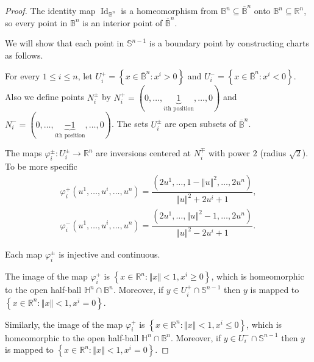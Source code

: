 \begin{proof}
    The identity map \( \operatorname{Id}_{\mathbb{B}^{n}} \) is a homeomorphism from \( \mathbb{B}^{n} \subseteq \overline{\mathbb{B}}^{n} \) onto \( \mathbb{B}^{n} \subseteq \mathbb{R}^{n} \), so every point in \( \mathbb{B}^{n} \) is an interior point of \( \overline{\mathbb{B}}^{n} \).

    We will show that each point in \( \mathbb{S}^{n-1} \) is a boundary point by constructing charts as follows.

    For every \( 1 \le i \le n \), let \( U_{i}^{+} = \left\{ x \in \overline{\mathbb{B}}^{n} : x^{i} > 0 \right\} \) and \( U_{i}^{-} = \left\{ x \in \overline{\mathbb{B}}^{n} : x^{i} < 0 \right\} \). Also we define points \( N_{i}^{\pm} \) by \( N_{i}^{+} = (0, \ldots, \underbrace{1}_{i\text{th position}}, \ldots, 0) \) and \( N_{i}^{-} = (0, \ldots, \underbrace{-1}_{i\text{th position}}, \ldots, 0) \). The sets \( U_{i}^{\pm} \) are open subsets of \( \overline{\mathbb{B}}^{n} \).

    The maps \( \varphi_{i}^{\pm}: U_{i}^{\pm} \to \mathbb{R}^{n} \) are inversions centered at \( N_{i}^{\mp} \) with power \( 2 \) (radius \(\sqrt{2}\)). To be more specific
    \begingroup
    \allowdisplaybreaks%
    \begin{align*}
        \varphi_{i}^{+}(u^{1}, \ldots, u^{i}, \ldots, u^{n}) = \dfrac{(2u^{1}, \ldots, 1 - {\left\Vert u \right\Vert}^{2}, \ldots, 2u^{n})}{{\left\Vert u \right\Vert}^{2} + 2u^{i} + 1}, \\
        \varphi_{i}^{-}(u^{1}, \ldots, u^{i}, \ldots, u^{n}) = \dfrac{(2u^{1}, \ldots, {\left\Vert u \right\Vert}^{2} - 1, \ldots, 2u^{n})}{{\left\Vert u \right\Vert}^{2} - 2u^{i} + 1}.
    \end{align*}
    \endgroup

    Each map \( \varphi_{i}^{\pm} \) is injective and continuous.

    The image of the map \( \varphi_{i}^{+} \) is \( \left\{ x \in \mathbb{R}^{n} : \left\Vert x \right\Vert < 1, x^{i} \ge 0 \right\} \), which is homeomorphic to the open half-ball \( \mathbb{H}^{n} \cap \mathbb{B}^{n} \). Moreover, if \( y \in U_{i}^{+} \cap \mathbb{S}^{n-1} \) then \( y \) is mapped to \( \left\{ x \in \mathbb{R}^{n} : \left\Vert x \right\Vert < 1, x^{i} = 0 \right\} \).

    Similarly, the image of the map \( \varphi_{i}^{+} \) is \( \left\{ x \in \mathbb{R}^{n} : \left\Vert x \right\Vert < 1, x^{i} \le 0 \right\} \), which is homeomorphic to the open half-ball \( \mathbb{H}^{n} \cap \mathbb{B}^{n} \). Moreover, if \( y \in U_{i}^{-} \cap \mathbb{S}^{n-1} \) then \( y \) is mapped to \( \left\{ x \in \mathbb{R}^{n} : \left\Vert x \right\Vert < 1, x^{i} = 0 \right\} \).


\end{proof}
